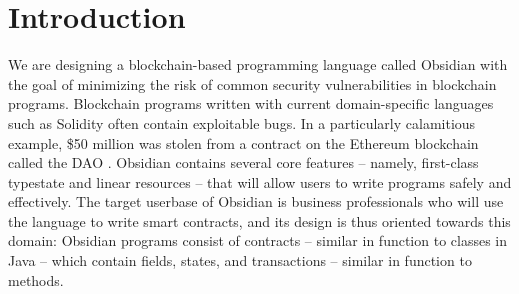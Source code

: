 \documentclass[sigplan,10pt,review]{acmart}\settopmatter{printfolios=true}
\begin{document}
\maketitle
\renewcommand{\shortauthors}{Barnaby et al.}

\section{Introduction}


We are designing a blockchain-based programming language called Obsidian \cite{Coblenz} with the goal of 
minimizing the risk of common security vulnerabilities in blockchain programs. Blockchain
programs written with current domain-specific languages such as Solidity \cite{Solidity} often contain
exploitable bugs. In a particularly calamitious example, \$50 million was stolen from a contract on the 
Ethereum blockchain called the DAO \cite{Sirer}. Obsidian contains several core features
 -- namely, first-class typestate and linear resources -- that will allow users 
to write programs safely and effectively. The target 
userbase of Obsidian is business professionals who will use the language to write smart contracts, 
and its design is thus oriented towards this domain: Obsidian programs consist of contracts --
similar in function to classes in Java -- which contain fields, states, and transactions -- similar in
function to methods.
\end{document}
